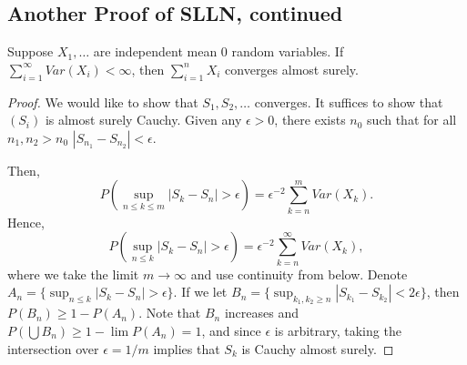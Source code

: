 \documentclass[11pt]{scrartcl}
\begin{document}
\subsection{Another Proof of SLLN, continued}
\begin{thm} Suppose $X_1, \dots$ are independent mean 0 random variables.  If $\sum_{i=1}^{\infty} Var(X_i) < \infty$, then $\sum_{i=1}^n X_i$ converges almost surely.
\end{thm}
\begin{proof}
We would like to show that $S_1, S_2, \dots$ converges.  It suffices to show that $(S_i)$ is almost surely Cauchy.  Given any $\epsilon > 0$, there exists $n_0$ such that for all $n_1, n_2 > n_0$ $|S_{n_1} - S_{n_2}| < \epsilon$.

Then,
$$P\left (\sup_{n \le k \le m} |S_k - S_n| > \epsilon\right ) = \epsilon^{-2}\sum_{k=n}^m Var(X_k).$$
Hence,
$$P\left (\sup_{n \le k } |S_k - S_n| > \epsilon\right ) = \epsilon^{-2}\sum_{k=n}^\infty Var(X_k),$$
where we take the limit $m \rightarrow \infty$ and use continuity from below.  Denote $A_n = \{\sup_{n \le k } |S_k - S_n| > \epsilon\}$.  If we let $B_n = \{\sup_{k_1, k_2 \ge n} |S_{k_1} - S_{k_2}| < 2\epsilon \}$, then $P(B_n) \ge 1-P(A_n)$.  Note that $B_n$ increases and $P(\bigcup B_n) \ge 1 - \lim P(A_n) = 1$, and since $\epsilon$ is arbitrary, taking the intersection over $\epsilon = 1/m$ implies that $S_k$ is Cauchy almost surely.
\end{proof}
\end{document}
